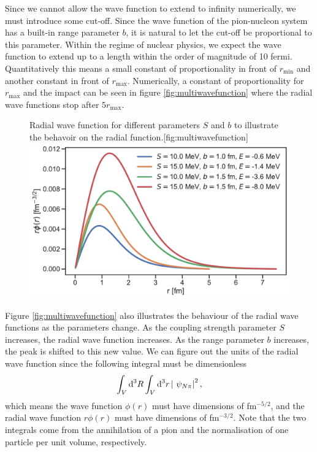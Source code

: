 Since we cannot allow the wave function to extend to infinity numerically, we must introduce some cut-off. Since the wave function of the pion-nucleon system has a built-in range parameter $b$, it is natural to let the cut-off be proportional to this parameter.
Within the regime of nuclear physics, we expect the wave function to extend up to a length within the order of magnitude of 10 fermi. Quantitatively this means a small constant of proportionality in front of $r_\text{min}$ and another constant in front of $r_{\text{max}}$. Numerically, a constant of proportionality for $r_{\text{max}}$ and the impact can be seen in figure \ref{fig:multiwavefunction} where the radial wave functions stop after $5r_\text{max}$.
\begin{figure}[H]
	\begin{sidecaption}{Radial wave function for different parameters $S$ and $b$ to illustrate the behavoir on the radial function.}[fig:multiwavefunction]
		\includegraphics[width=\linewidth]{Figures/multiwavefunction.pdf}
	\end{sidecaption}
\end{figure} 
Figure \ref{fig:multiwavefunction} also illustrates the behaviour of the radial wave functions as the parameters change. As the coupling strength parameter $S$ increases, the radial wave function increases. As the range parameter $b$ increases, the peak is shifted to this new value. We can figure out the units of the radial wave function since the following integral must be dimensionless 
\begin{equation} \label{volint}
	\int_V \text{d}^3R \int_V \text{d}^3r \, \abs{ \psi_{N\pi}}^2,
\end{equation}
which means the wave function $\phi(r)$ must have dimensions of fm$^{-5/2}$, and the radial wave function $r\phi(r)$ must have dimensions of fm$^{-3/2}$. Note that the two integrals come from the annihilation of a pion and the normalisation of one particle per unit volume, respectively.
\newpage
